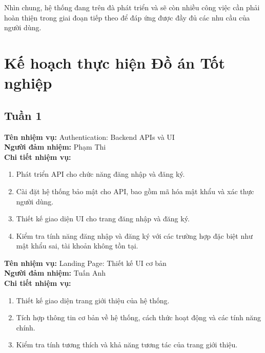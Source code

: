 Nhìn chung, hệ thống đang trên đà phát triển và sẽ còn nhiều công việc cần phải hoàn thiện trong giai đoạn tiếp theo để đáp ứng được đầy đủ các nhu cầu của người dùng.

\newpage
\section{Kế hoạch thực hiện Đồ án Tốt nghiệp}
\subsection*{Tuần 1}

\noindent \textbf{Tên nhiệm vụ:} Authentication: Backend APIs và UI \\
\noindent \textbf{Người đảm nhiệm:} Phạm Thi \\
\noindent \textbf{Chi tiết nhiệm vụ:}
\begin{enumerate}[label=-]
    \item Phát triển API cho chức năng đăng nhập và đăng ký.
    \item Cài đặt hệ thống bảo mật cho API, bao gồm mã hóa mật khẩu và xác thực người dùng.
    \item Thiết kế giao diện UI cho trang đăng nhập và đăng ký.
    \item Kiểm tra tính năng đăng nhập và đăng ký với các trường hợp đặc biệt như mật khẩu sai, tài khoản không tồn tại.
\end{enumerate}

\noindent \textbf{Tên nhiệm vụ:} Landing Page: Thiết kế UI cơ bản \\
\noindent \textbf{Người đảm nhiệm:} Tuấn Anh \\
\noindent \textbf{Chi tiết nhiệm vụ:}
\begin{enumerate}[label=-]
    \item Thiết kế giao diện trang giới thiệu của hệ thống.
    \item Tích hợp thông tin cơ bản về hệ thống, cách thức hoạt động và các tính năng chính.
    \item Kiểm tra tính tương thích và khả năng tương tác của trang giới thiệu.
\end{enumerate}

